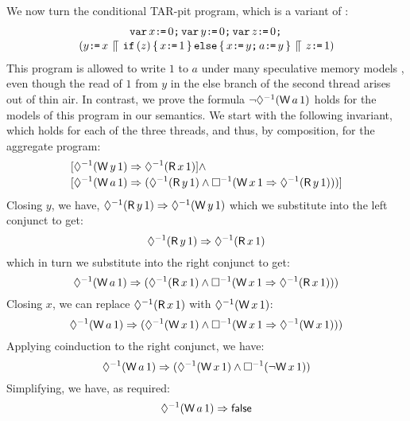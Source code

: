 \documentclass[conference]{IEEEtran}
\theoremstyle{plain}
\theoremstyle{definition}
\begin{document}
We now turn the conditional TAR-pit program, which is a variant of \cite[Figure 8]{DBLP:journals/toplas/Lochbihler13}:
\begin{multline*}
  \texttt{var}\, x\texttt{:}\mkern-1mu\texttt{=}\,0\texttt{;}\, \texttt{var}\, y\texttt{:}\mkern-1mu\texttt{=}\,0\texttt{;}\, \texttt{var}\, z\texttt{:}\mkern-1mu\texttt{=}\,0\texttt{;}\,  \\[-.5ex] (
    y\texttt{:}\mkern-1mu\texttt{=}\, x
  \,\mathbin{\llceil}\,
    \texttt{if}\,(z)\,\{\, x\texttt{:}\mkern-1mu\texttt{=}\,1 \,\}\,\texttt{else}\,\{\, x\texttt{:}\mkern-1mu\texttt{=}\, y\texttt{;}\, a\texttt{:}\mkern-1mu\texttt{=}\, y \,\}
  \,\mathbin{\llceil}\,
    z\texttt{:}\mkern-1mu\texttt{=}\,1
  )
\end{multline*}
This program is allowed to write $1$ to $a$ under many speculative
memory models
\cite{Manson:2005:JMM:1047659.1040336,Jagadeesan:2010:GOS:2175486.2175503,DBLP:conf/popl/KangHLVD17},
even though the read of $1$ from $y$ in the else branch of the second
thread arises out of thin air.   In contrast, we prove the formula
\begin{math}
  \lnot\once(\DW{a}{1})
\end{math}
holds for the models of this program in our semantics.  We start with the following invariant,
which holds for each of the three threads, and thus, by composition, for the
aggregate program:
\begin{align*}
  &[\once(\DW{y}{1}) \Rightarrow \once(\DR{x}{1})]
  \land\\[-.5ex]
  &[\once(\DW{a}{1}) \Rightarrow (\once(\DR{y}{1}) \land \always(\DW{x}{1} \Rightarrow \once(\DR{y}{1})))]
\end{align*}
Closing $y$, we have,
\begin{math}
  \once(\DR{y}{1}) \Rightarrow \once(\DW{y}{1}) %
\end{math}
which we substitute into the left conjunct to get:
\begin{displaymath}
  \once(\DR{y}{1}) \Rightarrow \once(\DR{x}{1})
\end{displaymath}
which in turn we substitute into the right conjunct to get:
\begin{displaymath}
  \once(\DW{a}{1}) \Rightarrow (\once(\DR{x}{1}) \land \always(\DW{x}{1} \Rightarrow \once(\DR{x}{1})))
\end{displaymath}
Closing $x$, we can replace $\once(\DR{x}{1})$ with $\once(\DW{x}{1})$:
\begin{displaymath}
  \once(\DW{a}{1}) \Rightarrow (\once(\DW{x}{1}) \land \always(\DW{x}{1} \Rightarrow \once(\DW{x}{1})))
\end{displaymath}
Applying coinduction to the right conjunct, we have:
\begin{displaymath}
  \once(\DW{a}{1}) \Rightarrow (\once(\DW{x}{1}) \land \always(\lnot \DW{x}{1}))
\end{displaymath}
Simplifying, we have, as required:  
\begin{displaymath}
  \once(\DW{a}{1}) \Rightarrow \FALSE
\end{displaymath}
\end{document}

